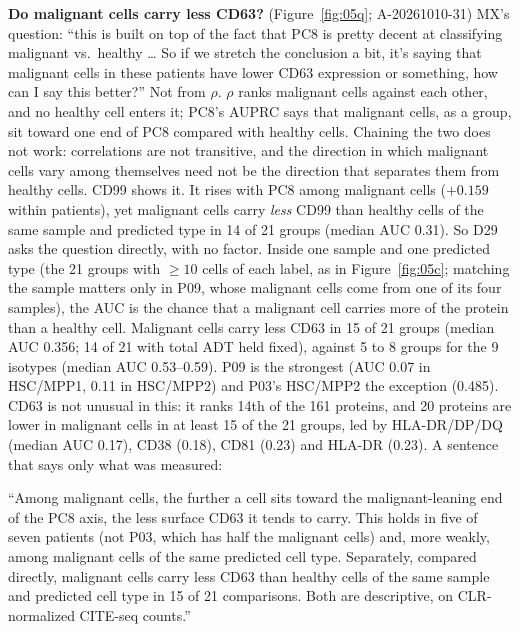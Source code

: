 \textbf{Do malignant cells carry less CD63?} (Figure~\ref{fig:05q}; A-20261010-31) MX's question: ``this is built on top of the fact that PC8 is pretty decent at classifying malignant vs.\ healthy \ldots{} So if we stretch the conclusion a bit, it's saying that malignant cells in these patients have lower CD63 expression or something, how can I say this better?'' Not from $\rho$. $\rho$ ranks malignant cells against each other, and no healthy cell enters it; PC8's AUPRC says that malignant cells, as a group, sit toward one end of PC8 compared with healthy cells. Chaining the two does not work: correlations are not transitive, and the direction in which malignant cells vary among themselves need not be the direction that separates them from healthy cells. CD99 shows it. It rises with PC8 among malignant cells ($+0.159$ within patients), yet malignant cells carry \emph{less} CD99 than healthy cells of the same sample and predicted type in 14 of 21 groups (median AUC 0.31). So D29 asks the question directly, with no factor. Inside one sample and one predicted type (the 21 groups with $\geq 10$ cells of each label, as in Figure~\ref{fig:05c}; matching the sample matters only in P09, whose malignant cells come from one of its four samples), the AUC is the chance that a malignant cell carries more of the protein than a healthy cell. Malignant cells carry less CD63 in 15 of 21 groups (median AUC 0.356; 14 of 21 with total ADT held fixed), against 5 to 8 groups for the 9 isotypes (median AUC 0.53--0.59). P09 is the strongest (AUC 0.07 in HSC/MPP1, 0.11 in HSC/MPP2) and P03's HSC/MPP2 the exception (0.485). CD63 is not unusual in this: it ranks 14th of the 161 proteins, and 20 proteins are lower in malignant cells in at least 15 of the 21 groups, led by HLA-DR/DP/DQ (median AUC 0.17), CD38 (0.18), CD81 (0.23) and HLA-DR (0.23). A sentence that says only what was measured:

\begin{teambox}
``Among malignant cells, the further a cell sits toward the malignant-leaning end of the PC8 axis, the less surface CD63 it tends to carry. This holds in five of seven patients (not P03, which has half the malignant cells) and, more weakly, among malignant cells of the same predicted cell type. Separately, compared directly, malignant cells carry less CD63 than healthy cells of the same sample and predicted cell type in 15 of 21 comparisons. Both are descriptive, on CLR-normalized CITE-seq counts.''
\end{teambox}

